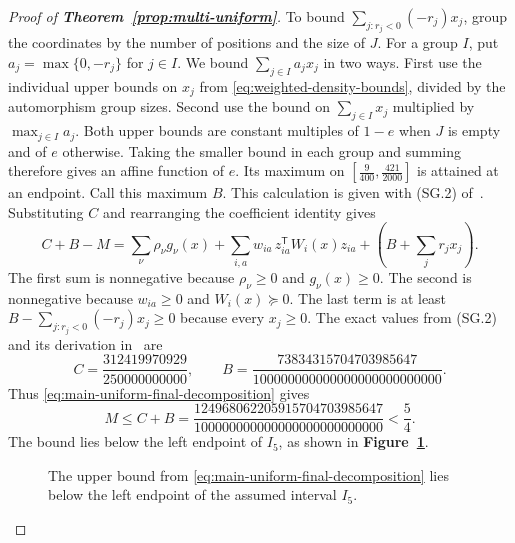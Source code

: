 \documentclass[preprint,11pt,numbers]{elsarticle-arxiv}
\numberwithin{equation}{section}
\theoremstyle{definition}
\newenvironment{lateproof}[1]{\begin{proof}[Proof of #1]}{\end{proof}}
\begin{document}
\begin{lateproof}{\textbf{Theorem~\ref{prop:multi-uniform}}}
To bound $\sum_{j:r_j<0}(-r_j)x_j$, group the coordinates
by the number of positions and the size of $J$. For a group
$I$, put $a_j=\max\{0,-r_j\}$ for $j\in I$. We bound
$\sum_{j\in I}a_jx_j$ in two ways. First use the individual
upper bounds on $x_j$ from \eqref{eq:weighted-density-bounds},
divided by the automorphism group sizes. Second use the bound
on $\sum_{j\in I}x_j$ multiplied by $\max_{j\in I}a_j$.
Both upper bounds are constant multiples of $1-e$ when $J$
is empty and of $e$ otherwise. Taking the smaller bound in
each group and summing therefore gives an affine function of $e$.
Its maximum on
$[\frac{9}{400},\frac{421}{2000}]$ is attained at an endpoint.
Call this maximum $B$. This calculation is given with
(SG.2) of~\cite{FGSTSupplement}.
Substituting $C$ and rearranging the coefficient identity gives
\begin{equation}\label{eq:main-uniform-final-decomposition}
 C+B-M
 =\sum_\nu \rho_\nu g_\nu(x)
   +\sum_{i,a}w_{ia}\,z_{ia}^{\mathsf T}W_i(x)z_{ia}
   +\left(B+\sum_j r_jx_j\right).
\end{equation}
The first sum is nonnegative because $\rho_\nu\geq0$ and
$g_\nu(x)\geq0$. The second is nonnegative because
$w_{ia}\geq0$ and $W_i(x)\succeq0$. The last term is at least
$B-\sum_{j:r_j<0}(-r_j)x_j\geq0$ because every $x_j\geq0$.
The exact values from (SG.2)
and its derivation in~\cite{FGSTSupplement} are
\[
 C=\frac{312419970929}{250000000000},
 \qquad B=\frac{73834315704703985647}{100000000000000000000000000}.
\]
Thus \eqref{eq:main-uniform-final-decomposition} gives
\begin{equation}\label{eq:main-uniform-final-certificate}
 M\leq C+B=\frac{124968062205915704703985647}
                   {100000000000000000000000000}
       <\frac{5}{4}.
\end{equation}
The bound lies below the left endpoint of $I_5$, as shown in
\textbf{Figure~\ref{fig:uniform-final-interval}}.

\begin{figure}[htbp]
\centering
{}
\caption{The upper bound from \eqref{eq:main-uniform-final-decomposition}
lies below the left endpoint of the assumed interval $I_5$.}
\label{fig:uniform-final-interval}
\end{figure}


\end{lateproof}
\end{document}
